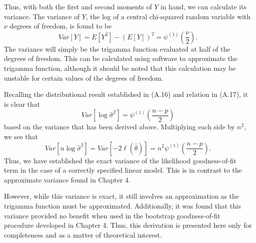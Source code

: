 Thus, with both the first and second moments of $Y$ in hand, we can calculate its variance. The variance of $Y$, the log of a central chi-squared random variable with
$\nu$ degrees of freedom, is found to be
\begin{equation}
	Var \left[ Y \right ] = E \left[ Y^2 \right] - \left( E \left[ Y \right] \right)^2 = \psi^{(1)} \left( \frac{\nu}{2} \right) .
\end{equation}
The variance will simply be the trigamma function evaluated at half of the degrees of freedom. This can be calculated using software to approximate the trigamma function,
although it should be noted that this calculation may be unstable for certain values of the degrees of freedom.

Recalling the distributional result established in (A.16) and relation in (A.17), it is clear that
\begin{equation}
	Var \left[ \log \hat{\sigma}^2 \right] = \psi^{(1)} \left( \frac{n-p}{2} \right)
\end{equation}
based on the variance that has been derived above. Multiplying each side by $n^2$, we see that
\begin{equation}
	Var \left[ n \log \hat{\sigma}^2 \right] = Var \left[ -2 \ell (\hat{\theta} ) \right] = n^2 \psi^{(1)} \left( \frac{n-p}{2} \right).
\end{equation}
Thus, we have established the exact variance of the likelihood goodness-of-fit term in the case of a correctly specified linear model. This is in contrast to the
approximate variance found in Chapter 4.

However, while this variance is exact, it still involves an approximation as the trigamma function must be approximated. Additionally, it was found that
this variance provided no benefit when used in the bootstrap goodness-of-fit procedure developed in Chapter 4. Thus, this derivation is presented here only
for completeness and as a matter of theoretical interest.










